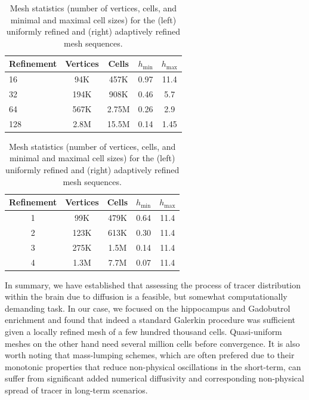 \begin{table}%
  \centering
  \begin{minipage}{.45\textwidth}%
    \begin{tabular}{l|cccc}
      Refinement & Vertices & Cells  & $h_{\min}$ & $h_{\max}$ \\ \hline
      16 & 94K & 457K & 0.97 & 11.4 \\  
      32 & 194K & 908K &  0.46 & 5.7 \\  
      64 & 567K &  2.75M & 0.26 & 2.9 \\
      128 &  2.8M & 15.5M &  0.14 & 1.45
    \end{tabular}
  \end{minipage}%
  \hspace{2em}
  \begin{minipage}{.45\textwidth}%
    \begin{tabular}{c|cccc}
	    Refinement & Vertices & Cells & $h_{\min}$ & $h_{\max}$ \\ \hline
	     1 & 99K &  479K &  0.64 &  11.4 \\
	     2 & 123K& 613K & 0.30 &  11.4 \\
	     3 & 275K &  1.5M  &  0.14 & 11.4 \\
	     4 & 1.3M &  7.7M  & 0.07 &  11.4 \\
    \end{tabular}
  \end{minipage}
  \caption{Mesh statistics (number of vertices, cells, and minimal and
    maximal cell sizes) for the (left) uniformly refined and
    (right) adaptively refined mesh sequences.}
  \label{chp6:meshstat}
\end{table}

In summary, we have established that assessing the process of tracer
distribution within the brain due to diffusion is a feasible, but
somewhat computationally demanding task. In our case, we focused on
the hippocampus and Gadobutrol enrichment and found that indeed a
standard Galerkin procedure was sufficient given a locally refined
mesh of a few hundred thousand cells. Quasi-uniform meshes on the
other hand need several million cells before convergence. It is also
worth noting that mass-lumping schemes, which are often prefered due
to their monotonic properties that reduce non-physical oscillations in
the short-term, can suffer from significant added numerical
diffusivity and corresponding non-physical spread of tracer in
long-term scenarios.
